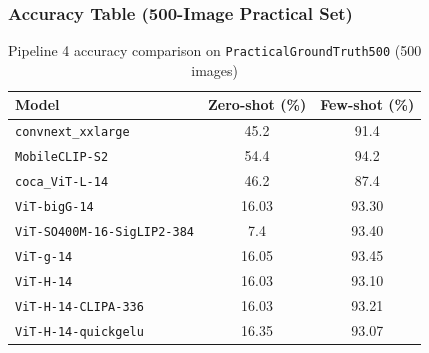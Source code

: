 \subsubsection*{Accuracy Table (500-Image Practical Set)}
\begin{table}[H]
\centering
\caption{Pipeline 4 accuracy comparison on \texttt{PracticalGroundTruth500} (500 images)}
\label{tab:part3_pipeline4_zerofewshot}
\begin{tabular}{>{\raggedright\arraybackslash}p{}cc}
\toprule
\textbf{Model} & \textbf{Zero-shot (\%)} & \textbf{Few-shot (\%)} \\
\midrule
\texttt{convnext\_xxlarge} & 45.2 & 91.4 \\
\texttt{MobileCLIP-S2} & 54.4 & 94.2 \\
\texttt{coca\_ViT-L-14} & 46.2 & 87.4 \\
\texttt{ViT-bigG-14} & 16.03 & 93.30 \\
\texttt{ViT-SO400M-16-SigLIP2-384} & 7.4 & 93.40 \\
\texttt{ViT-g-14} & 16.05 & 93.45 \\
\texttt{ViT-H-14} & 16.03 & 93.10 \\
\texttt{ViT-H-14-CLIPA-336} & 16.03 & 93.21 \\
\texttt{ViT-H-14-quickgelu} & 16.35 & 93.07 \\
\bottomrule
\end{tabular}
\end{table}
